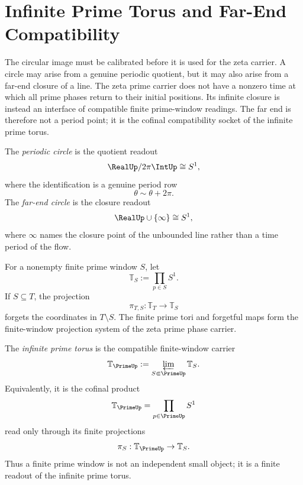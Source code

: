 \section{Infinite Prime Torus and Far-End Compatibility}
\label{sec:unified-reality-infinite-prime-torus-far-end-compatibility}

The circular image must be calibrated before it is used for the zeta
carrier.  A circle may arise from a genuine periodic quotient, but it
may also arise from a far-end closure of a line.  The zeta prime carrier
does not have a nonzero time at which all prime phases return to their
initial positions.  Its infinite closure is instead an interface of
compatible finite prime-window readings.  The far end is therefore not a
period point; it is the cofinal compatibility socket of the infinite
prime torus.

\begin{definition}
\label{def:unified-reality-periodic-circle-far-end-circle}
The \emph{periodic circle} is the quotient readout
$$
\RealUp/2\pi\IntUp\cong S^1,
$$
where the identification is a genuine period row
$$
\theta\sim\theta+2\pi.
$$
The \emph{far-end circle} is the closure readout
$$
\RealUp\cup\{\infty\}\cong S^1,
$$
where $\infty$ names the closure point of the unbounded line rather than
a time period of the flow.
\end{definition}

\begin{definition}
\label{def:unified-reality-finite-prime-torus-projection-system}
For a nonempty finite prime window $S$, let
$$
\mathbb T_S:=\prod_{p\in S}S^1.
$$
If $S\subseteq T$, the projection
$$
\pi_{T,S}:\mathbb T_T\to\mathbb T_S
$$
forgets the coordinates in $T\setminus S$.  The finite prime tori and
forgetful maps form the finite-window projection system of the zeta
prime phase carrier.
\end{definition}

\begin{definition}
\label{def:unified-reality-infinite-prime-torus}
The \emph{infinite prime torus} is the compatible finite-window carrier
$$
\mathbb T_{\PrimeUp}
:=
\varprojlim_{S\Subset\PrimeUp}
\mathbb T_S.
$$
Equivalently, it is the cofinal product
$$
\mathbb T_{\PrimeUp}
=
\prod_{p\in\PrimeUp}S^1
$$
read only through its finite projections
$$
\pi_S:\mathbb T_{\PrimeUp}\to\mathbb T_S.
$$
Thus a finite prime window is not an independent small object; it is a
finite readout of the infinite prime torus.
\end{definition}

